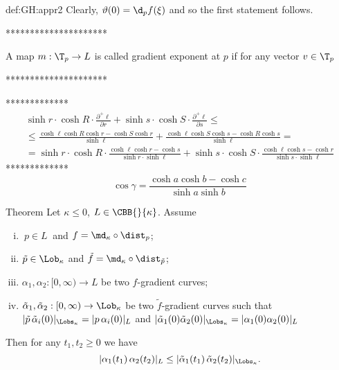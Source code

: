 {\begin{subthm}{def:GH:appr2}
Clearly, $\vartheta(0)=\d_p f(\xi)$ and so the first statement follows.\qeds

*********************

A map $m:\T_p\to L$ is called gradient exponent at $p$ if for any vector $v\in \T_p$

*********************


























*************
\begin{multline*}
 \sinh r\cdot\cosh R\cdot\frac{\partial^+\ell}{\partial r}
+
\sinh s\cdot\cosh S\cdot\frac{\partial^+\ell}{\partial s}
\le
\\
\le
\frac{\cosh\ell\cosh R\cosh r-{\cosh S}\cosh r}{\sinh\ell}
+
\frac{\cosh\ell\cosh S\cosh s-{\cosh R}\cosh s}{\sinh\ell}
=
\\
=
\sinh r\cdot\cosh R\cdot\frac{\cosh\ell\cosh r-\cosh s}{\sinh r\cdot\sinh\ell}
+
\sinh s\cdot\cosh S\cdot\frac{\cosh\ell\cosh s-\cosh r}{\sinh s\cdot\sinh\ell}
\end{multline*}
*************
$$\cos\gamma=\frac{\cosh a \cosh b-\cosh c}{\sinh a\sinh b} $$





\begin{thm}{Theorem} Let $\kappa\le 0$, $L\in\CBB{}{\kappa}$.
Assume
\begin{enumerate}[(i)]
\item $\ p\in L\ $ and $  f=\md_\kappa\circ\dist_{  p}$;
\item $\tilde p\in\Lob_\kappa$            and $\tilde f=\md_\kappa\circ\dist_{\tilde p}$;
\item $  \alpha_1,  \alpha_2:[0,\infty)\to           L$ be two $  f$-gradient curves;
\item $\tilde \alpha_1,\tilde \alpha_2:[0,\infty)\to \Lob_\kappa$ be two $\tilde f$-gradient curves such that
\subitem $|\tilde p\,\tilde \alpha_i(0)|_{\Lobs_\kappa}=|p\,\alpha_i(0)|_L$ 
and $|\tilde \alpha_1(0)\tilde \alpha_2(0)|_{\Lobs_\kappa}=|\alpha_1(0)\alpha_2(0)|_L$ 
\end{enumerate}
Then for any $t_1,t_2\ge 0$ we have 
$$|\alpha_1(t_1)\,\alpha_2(t_2)|_L\le |\tilde \alpha_1(t_1)\,\tilde \alpha_2(t_2)|_{\Lobs_\kappa}.$$
\end{thm}


\end{subthm}}
